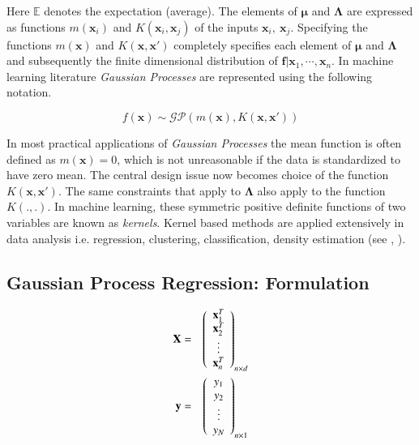 \documentclass[referee,a4paper,12pt,traditabstract]{swsc}
\begin{document}
\begin{linenumbers}
Here $\mathbb{E}$ denotes the expectation (average). The elements of $\mathbf{\mu}$ and $\mathbf{\Lambda}$ are expressed as functions $m(\mathbf{x}_i)$ and $K(\mathbf{x}_i, \mathbf{x}_j)$ of the inputs $\mathbf{x}_i,\ \mathbf{x}_j$. Specifying the functions $m(\mathbf{x})$ and $K(\mathbf{x}, \mathbf{x}')$ completely specifies each element of $\mathbf{\mu}$ and $\mathbf{\Lambda}$ and subsequently the finite dimensional distribution of $\mathbf{f} | \mathbf{x}_1, \cdots, \mathbf{x}_n $. In machine learning literature \emph{Gaussian Processes} are represented using the following notation.

\begin{equation}
    f(\mathbf{x}) \sim \mathcal{GP}(m(\mathbf{x}), K(\mathbf{x}, \mathbf{x}'))
\end{equation}

In most practical applications of \emph{Gaussian Processes} the mean function is often defined as $m(\mathbf{x}) = 0$, which is not unreasonable if the data is standardized to have zero mean. The central design issue now becomes choice of the function $K(\mathbf{x}, \mathbf{x}')$. The same constraints that apply to $\mathbf{\Lambda}$ also apply to the function $K(.,.)$. In machine learning, these symmetric positive definite functions of two variables are known as \emph{kernels}. Kernel based methods are applied extensively in data analysis i.e. regression, clustering, classification, density estimation (see \citet{Scholkopf:2001:LKS:559923}, \citet{hofmann2008}).

\subsection{Gaussian Process Regression: Formulation}

\begin{eqnarray}
  \mathbf{X} & = & \left( \begin{array}{c} \mathbf{x}^{T}_1 \\ \mathbf{x}^{T}_2 \\ \vdots \\ \mathbf{x}^{T}_n \end{array} \right)_{n \times d} \label{eq:feat} \\
  \vspace{2\baselineskip}
  \mathbf{y} & = & \left( \begin{array}{c} y_1 \\ y_2 \\ \vdots \\ y_N \end{array} \right) _{n \times 1} \label{eq:labels}
\end{eqnarray}


\end{linenumbers}
\end{document}
